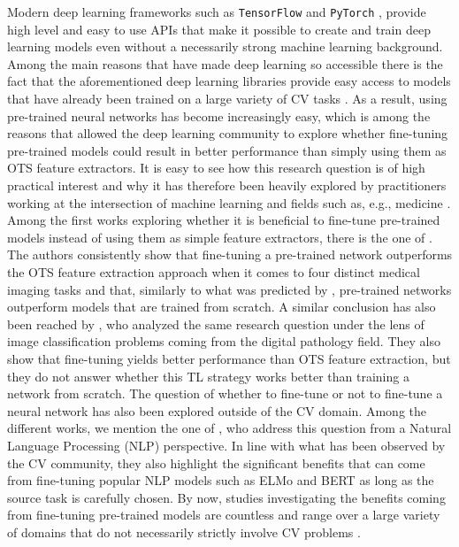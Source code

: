 Modern deep learning frameworks such as \texttt{TensorFlow} \cite{abadi2016tensorflow} and \texttt{PyTorch} \cite{paszke2017automatic}, provide high level and easy to use APIs that make it possible to create and train deep learning models even without a necessarily strong machine learning background. Among the main reasons that have made deep learning so accessible there is the fact that the aforementioned deep learning libraries provide easy access to models that have already been trained on a large variety of CV tasks \cite{russakovsky2015imagenet, lin2014microsoft, everingham2010pascal}. As a result, using pre-trained neural networks has become increasingly easy, which is among the reasons that allowed the deep learning community to explore whether fine-tuning pre-trained models could result in better performance than simply using them as OTS feature extractors. It is easy to see how this research question is of high practical interest and why it has therefore been heavily explored by practitioners working at the intersection of machine learning and fields such as, e.g., medicine \cite{tajbakhsh2016convolutional,ho2021evaluation}. Among the first works exploring whether it is beneficial to fine-tune pre-trained models instead of using them as simple feature extractors, there is the one of \citet{tajbakhsh2016convolutional}. The authors consistently show that fine-tuning a pre-trained network outperforms the OTS feature extraction approach when it comes to four distinct medical imaging tasks and that, similarly to what was predicted by \citet{zeiler2014visualizing}, pre-trained networks outperform models that are trained from scratch. A similar conclusion has also been reached by \citet{mormont2018comparison}, who analyzed the same research question under the lens of image classification problems coming from the digital pathology field. They also show that fine-tuning yields better performance than OTS feature extraction, but they do not answer whether this TL strategy works better than training a network from scratch. The question of whether to fine-tune or not to fine-tune a neural network has also been explored outside of the CV domain. Among the different works, we mention the one of \citet{peters2019tune}, who address this question from a Natural Language Processing (NLP) perspective. In line with what has been observed by the CV community, they also highlight the significant benefits that can come from fine-tuning popular NLP models such as ELMo \cite{peters2018deep} and BERT \cite{devlin2018bert} as long as the source task is carefully chosen. By now, studies investigating the benefits coming from fine-tuning pre-trained models are countless and range over a large variety of domains that do not necessarily strictly involve CV problems \cite{ackermann2018using,dominguez2019transfer,george2017deep,boulanger2013audio,deng2013new,kong2020panns,zarrella2016mitre,howard2018universal,houlsby2019parameter}.


